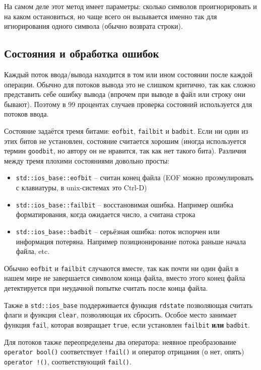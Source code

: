 \documentclass[a4paper,12pt,oneside]{book}
\begin{document}
На самом деле этот метод имеет параметры: сколько символов проигнорировать и на каком остановиться, но чаще всего он вызывается именно так для игнорирования одного символа (обычно возврата строки).

\subsection{Состояния и обработка ошибок}

Каждый поток ввода/вывода находится в том или ином состоянии после каждой операции. Обычно для потоков вывода это не слишком критично, так как сложно представить себе ошибку вывода (впрочем при выводе в файл или строку они бывают). Поэтому в 99 процентах случаев проверка состояний используется для потоков ввода.

Состояние задаётся тремя битами: \lstinline!eofbit!, \lstinline!failbit! и \lstinline!badbit!. Если ни один из этих битов не установлен, состояние считается хорошим (иногда используется термин \lstinline!goodbit!, но автору он не нравится, так как нет такого бита). Различия между тремя плохими состояниями довольно просты:

\begin{itemize}
\item \lstinline!std::ios_base::eofbit! -- считан конец файла (EOF можно проэмулировать с клавиатуры, в unix-системах это Ctrl-D)
\item \lstinline!std::ios_base::failbit! -- восстановимая ошибка. Например ошибка форматирования, когда ожидается число, а считана строка
\item \lstinline!std::ios_base::badbit! -- серьёзная ошибка: поток испорчен или информация потеряна. Например позиционирование потока раньше начала файла, etc.
\end{itemize}

Обычно \lstinline!eofbit! и \lstinline!failbit! случаются вместе, так как почти ни один файл в нашем мире не завершается символом конца файла, вместо этого конец файла детектируется при неудачной попытке считать после конца файла.

Также в \lstinline!std::ios_base! поддерживается функция \lstinline!rdstate! позволяющая считать флаги и функция \lstinline!clear!, позволяющая их сбросить. Особое место занимает функция \lstinline!fail!, которая возвращает \lstinline!true!, если установлен \lstinline!failbit! \textbf{или} \lstinline!badbit!.

Для потоков также переопределены два оператора: неявное преобразование \lstinline!operator bool()! соответствует \lstinline?!fail()? и оператор отрицания (о нет, опять) \lstinline?operator !()?, соответствующий \lstinline?fail()?.
\end{document}
